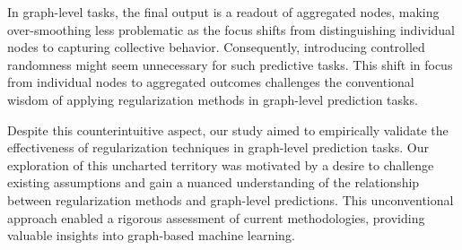 In graph-level tasks, the final output is a readout of aggregated nodes, making over-smoothing less problematic as the focus shifts from distinguishing individual nodes to capturing collective behavior. Consequently, introducing controlled randomness might seem unnecessary for such predictive tasks. This shift in focus from individual nodes to aggregated outcomes challenges the conventional wisdom of applying regularization methods in graph-level prediction tasks.

Despite this counterintuitive aspect, our study aimed to empirically validate the effectiveness of regularization techniques in graph-level prediction tasks. Our exploration of this uncharted territory was motivated by a desire to challenge existing assumptions and gain a nuanced understanding of the relationship between regularization methods and graph-level predictions. This unconventional approach enabled a rigorous assessment of current methodologies, providing valuable insights into graph-based machine learning.

\newcommand*{\addstd}[4]{
    \addplot[name path=#3upper, draw=none] table[x=#2, y expr=\thisrow{#3Avg}+\thisrow{#3Std}, col sep=semicolon] {#1};
    \addplot[name path=#3lower, draw=none] table[x=#2, y expr=\thisrow{#3Avg}-\thisrow{#3Std}, col sep=semicolon] {#1};
    \addplot[fill=#4, fill opacity=0.1] fill between[of=#3upper and #3lower];
}
\newcommand*{\layerplot}[6]{\begin{tikzpicture}
        \begin{axis}[
                width=0.8\linewidth,
                height=6cm,
                xlabel={#3},
                ylabel={#4},
                xtick={#5}, %
                ytick distance={#6}, %
                legend pos=outer north east,
                legend style={nodes={scale=0.6, transform shape}},
                grid=major,
            ]

            \addplot[color= p_red] table [x=#2, y=noneAvg, col sep=semicolon] {#1};
            \addlegendentry{No Regularization}

            \addplot[color= p_green] table [x=#2, y=dropoutAvg, col sep=semicolon] {#1};
            \addlegendentry{Dropout}

            \addplot[color= p_blue] table [x=#2, y=nodesamplingAvg, col sep=semicolon] {#1};
            \addlegendentry{Node Sampling}

            \addplot[color= p_yellow] table [x=#2, y=dropedgeAvg, col sep=semicolon] {#1};
            \addlegendentry{DropEdge}

            \addplot[color= p_violet] table [x=#2, y=gdcAvg, col sep=semicolon] {#1};
            \addlegendentry{GDC}

            \addstd{#1}{#2}{none}{p_red}
            \addstd{#1}{#2}{dropout}{p_green}
            \addstd{#1}{#2}{nodesampling}{p_blue}
            \addstd{#1}{#2}{dropedge}{p_yellow}
            \addstd{#1}{#2}{gdc}{p_violet}
        \end{axis}
    \end{tikzpicture}}




